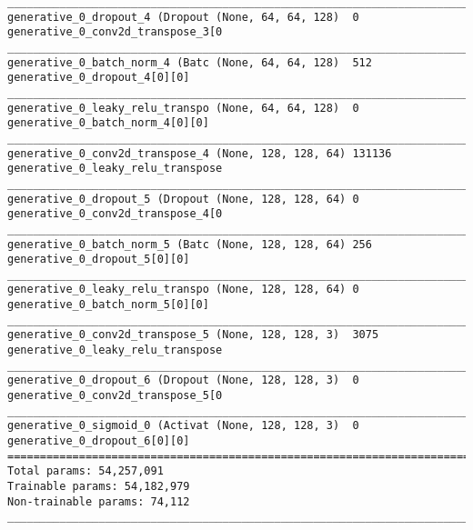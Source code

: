 \begin{lstlisting}[caption={CelebA-VLAE Decoder},captionpos=b,basicstyle=\tiny, label={lst:celeba-vlae-decoder}]
__________________________________________________________________________________________________
generative_0_dropout_4 (Dropout (None, 64, 64, 128)  0           generative_0_conv2d_transpose_3[0
__________________________________________________________________________________________________
generative_0_batch_norm_4 (Batc (None, 64, 64, 128)  512         generative_0_dropout_4[0][0]
__________________________________________________________________________________________________
generative_0_leaky_relu_transpo (None, 64, 64, 128)  0           generative_0_batch_norm_4[0][0]
__________________________________________________________________________________________________
generative_0_conv2d_transpose_4 (None, 128, 128, 64) 131136      generative_0_leaky_relu_transpose
__________________________________________________________________________________________________
generative_0_dropout_5 (Dropout (None, 128, 128, 64) 0           generative_0_conv2d_transpose_4[0
__________________________________________________________________________________________________
generative_0_batch_norm_5 (Batc (None, 128, 128, 64) 256         generative_0_dropout_5[0][0]
__________________________________________________________________________________________________
generative_0_leaky_relu_transpo (None, 128, 128, 64) 0           generative_0_batch_norm_5[0][0]
__________________________________________________________________________________________________
generative_0_conv2d_transpose_5 (None, 128, 128, 3)  3075        generative_0_leaky_relu_transpose
__________________________________________________________________________________________________
generative_0_dropout_6 (Dropout (None, 128, 128, 3)  0           generative_0_conv2d_transpose_5[0
__________________________________________________________________________________________________
generative_0_sigmoid_0 (Activat (None, 128, 128, 3)  0           generative_0_dropout_6[0][0]
==================================================================================================
Total params: 54,257,091
Trainable params: 54,182,979
Non-trainable params: 74,112
__________________________________________________________________________________________________
\end{lstlisting}